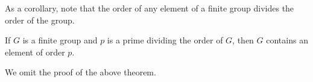 As a corollary, note that the order of any element of a finite group divides the order of the group.




\begin{theorem}
\label{CauchyTheorem}
    If $G$ is a finite group and $p$ is a prime dividing the order of $G$, then $G$ contains an element of order $p$.
\end{theorem}

We omit the proof of the above theorem.




\clearpage